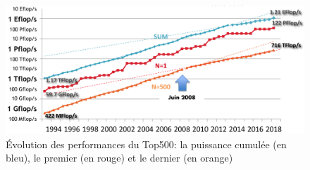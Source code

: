         
        \begin{figure}
        \center
        \includegraphics[width=14cm]{images/Top500_Poor.png}
        \caption{\label{fig:Top500_Poor} Évolution des performances du Top500: la puissance cumulée (en bleu), le premier (en rouge) et le dernier (en orange)\protect\footnotemark}
        \end{figure}
      